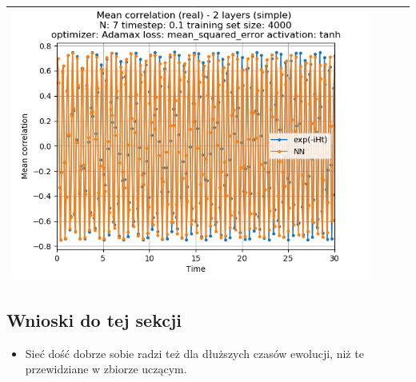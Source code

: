 \documentclass{article}
\begin{document}
\begin{tabular}{|c|c|c|c|}
     \includegraphics[scale=0.37]{./1,2,3x_longer_than_t_total/2_layers_simple_train_samples=4000_timestep=0.1_t_total=3x_optimizer=Adamax_loss=mean_squared_error_activation=tanh/Corr_N=7_(real).png} \\ \hline


\end{tabular}

\subsection{Wnioski do tej sekcji}

\begin{itemize}
	\item Sieć dość dobrze sobie radzi też dla dłuższych czasów ewolucji, niż te przewidziane w zbiorze uczącym.
\end{itemize}
\end{document}

